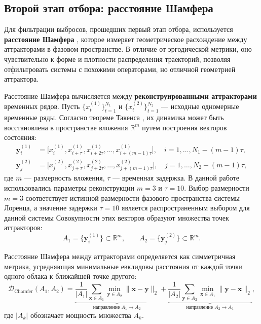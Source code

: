 \documentclass[a4paper,12pt]{extarticle}
\begin{document}
\subsection*{Второй этап отбора: расстояние Шамфера}
Для фильтрации выбросов, прошедших первый этап отбора, используется \textbf{расстояние Шамфера}
 \cite{Wu2021}, которое измеряет геометрическое расхождение между аттракторами
  в фазовом пространстве. В отличие от эргодической метрики, оно чувствительно к форме и
   плотности распределения траекторий, позволяя отфильтровать системы с похожими
    операторами, но отличной геометрией аттрактора.

Расстояние Шамфера вычисляется между \textbf{реконструированными аттракторами} временных рядов.
 Пусть $\{x^{(1)}_t\}_{t=1}^{N_1}$ и $\{x^{(2)}_t\}_{t=1}^{N_2}$ — исходные одномерные временные ряды.
  Согласно теореме Такенса \cite{Takens1981}, их динамика может быть восстановлена в пространстве
   вложения $\mathbb{R}^m$ путем построения векторов состояния:
\begin{align}
\mathbf{y}^{(1)}_i &= \bigl[x^{(1)}_i, x^{(1)}_{i+\tau}, x^{(1)}_{i+2\tau}, \dots, x^{(1)}_{i+(m-1)\tau}\bigr], \quad i = 1, \dots, N_1-(m-1)\tau, \\
\mathbf{y}^{(2)}_j &= \bigl[x^{(2)}_j, x^{(2)}_{j+\tau}, x^{(2)}_{j+2\tau}, \dots, x^{(2)}_{j+(m-1)\tau}\bigr], \quad j = 1, \dots, N_2-(m-1)\tau,
\end{align}
где $m$ — размерность вложения, $\tau$ — временная задержка. В данной работе использовались
 параметры реконструкции $m=3$ и $\tau=10$. Выбор размерности $m=3$ соответствует истинной размерности фазового пространства системы Лоренца, а
 значение задержки $\tau=10$ является распространенным выбором для данной системы Совокупности этих векторов образуют
 множества точек аттракторов:
\begin{equation}
A_1 = \{\mathbf{y}^{(1)}_i\} \subset \mathbb{R}^m, \qquad A_2 = \{\mathbf{y}^{(2)}_j\} \subset \mathbb{R}^m.
\end{equation}

Расстояние Шамфера между аттракторами определяется как симметричная метрика, усредняющая 
минимальные евклидовы расстояния от каждой точки одного облака к ближайшей точке другого:
\begin{equation}
\mathcal{D}_{\text{Chamfer}}(A_1, A_2) = \underbrace{\frac{1}{|A_1|}\sum_{\mathbf{x}\in A_1}\min_{\mathbf{y}\in A_2}\|\mathbf{x}-\mathbf{y}\|_2}_{\text{направление } A_1 \to A_2} + \underbrace{\frac{1}{|A_2|}\sum_{\mathbf{y}\in A_2}\min_{\mathbf{x}\in A_1}\|\mathbf{y}-\mathbf{x}\|_2}_{\text{направление } A_2 \to A_1},
\end{equation}
где $|A_k|$ обозначает мощность множества $A_k$.
\end{document}
